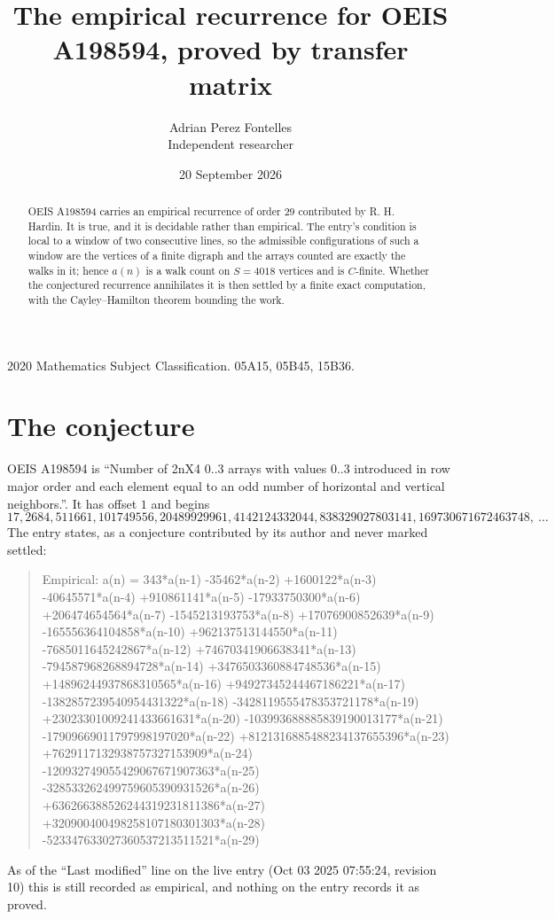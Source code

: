 \documentclass[11pt,a4paper]{article}
\title{The empirical recurrence for OEIS A198594, proved by transfer matrix}
\author{Adrian Perez Fontelles\\ \small Independent researcher}
\date{20 September 2026}
\theoremstyle{plain}
\theoremstyle{definition}
\begin{document}
\maketitle

\begin{abstract}
OEIS A198594 carries an empirical recurrence of order $29$ contributed by R. H. Hardin. It is
true, and it is decidable rather than empirical. The entry's condition is local to a window of two consecutive lines, so
the admissible configurations of such a window are the vertices of a finite digraph and the
arrays counted are exactly the walks in it; hence $a(n)$ is a walk count on $S=4018$ vertices
and is $C$-finite. Whether the conjectured recurrence annihilates it is then settled by a
finite exact computation, with the Cayley--Hamilton theorem bounding the work.
\end{abstract}

\noindent\small 2020 Mathematics Subject Classification. 05A15, 05B45, 15B36.\normalsize

\section{The conjecture}

OEIS A198594 is ``Number of 2nX4 0..3 arrays with values 0..3 introduced in row major order and each element equal to an odd number of horizontal and vertical neighbors.''. It has offset $1$ and begins
\[
17, 2684, 511661, 101749556, 20489929961, 4142124332044, 838329027803141, 169730671672463748,\ \dots
\]
The entry states, as a conjecture contributed by its author and never marked settled:
\begin{quote}\raggedright\small
Empirical: a(n) = 343*a(n-1) -35462*a(n-2) +1600122*a(n-3) -40645571*a(n-4) +910861141*a(n-5) -17933750300*a(n-6) +206474654564*a(n-7) -1545213193753*a(n-8) +17076900852639*a(n-9) -165556364104858*a(n-10) +962137513144550*a(n-11) -7685011645242867*a(n-12) +74670341906638341*a(n-13) -794587968268894728*a(n-14) +3476503360884748536*a(n-15) +14896244937868310565*a(n-16) +94927345244467186221*a(n-17) -1382857239540954431322*a(n-18) -3428119555478353721178*a(n-19) +23023301009241433661631*a(n-20) -103993688885839190013177*a(n-21) -17909669011797998197020*a(n-22) +8121316885488234137655396*a(n-23) +7629117132938757327153909*a(n-24) -120932749055429067671907363*a(n-25) -328533262499759605390931526*a(n-26) +636266388526244319231811386*a(n-27) +320900400498258107180301303*a(n-28) -523347633027360537213511521*a(n-29)
\end{quote}
As of the ``Last modified'' line on the live entry (Oct 03 2025 07:55:24, revision 10) this is still
recorded as empirical, and nothing on the entry records it as proved.
\end{document}
